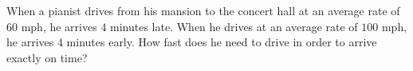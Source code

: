 When a pianist drives from his mansion to the concert hall at an average rate of $60$ mph, he arrives $4$ minutes late. When he drives at an average rate of $100$ mph, he arrives $4$ minutes early. How fast does he need to drive in order to arrive exactly on time?
